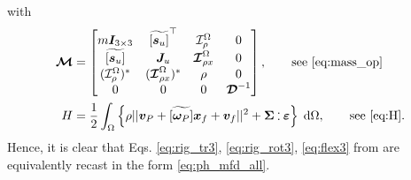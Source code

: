 \documentclass{svjour3}                     %
\newcommand{\crmat}[1]{\ensuremath{\widetilde{\left[#1\right]}}}
\def\onedot{$\mathsurround0pt\ldotp$}
\def\cddot{%
	\mathbin{\vcenter{\baselineskip.67ex
			\hbox{\onedot}\hbox{\onedot}}%
}}
\begin{document}
	with
	\begin{align*}
	\bm{\mathcal{M}} &= 
	\begin{bmatrix}
	m \bm{I}_{3\times 3} & \crmat{\bm{s}_u}^\top & \mathcal{I}_\rho^{\Omega} & 0 \\
	\crmat{\bm{s}_u} & \bm{J}_u & \bm{\mathcal{I}}_{\rho x}^{\Omega} & 0  \\
	(\mathcal{I}_\rho^{\Omega})^* & (\bm{\mathcal{I}}_{\rho x}^{\Omega})^* & \rho & 0  \\
	0 & 0 & 0 & \bm{\mathcal{D}}^{-1} \\
	\end{bmatrix}, \qquad \text{see \eqref{eq:mass_op}} \\
	H &= \frac{1}{2} \int_{\Omega} \left\{\rho ||\bm{v}_P + \crmat{\bm{\omega}_P} \bm{x}_f + {\bm{v}}_f||^2 + \bm\Sigma \cddot \bm\varepsilon \right\}  \d{\Omega}, \qquad \text{see \eqref{eq:H}}.
	\end{align*}
	Hence, it is clear that Eqs. \eqref{eq:rig_tr3}, \eqref{eq:rig_rot3}, \eqref{eq:flex3} from \cite{MB_Daepde,simeon2013computational} are equivalently recast in the form \eqref{eq:ph_mfd_all}.
	 
	
	
\end{document}
